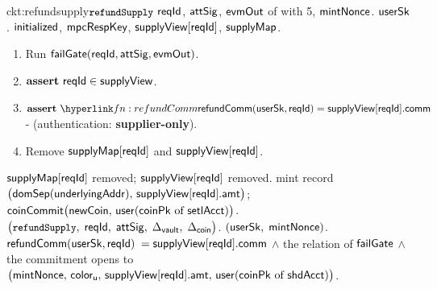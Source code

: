 \begin{CktBox}{ckt:refundsupply}{$\texttt{\small refundSupply}$}
 $\mathsf{reqId}$, $\mathsf{attSig}$, $\mathsf{evmOut}$ of with 5, $\mathsf{mintNonce}$.
 $\mathsf{userSk}$.
 $\mathsf{initialized}$, $\mathsf{mpcRespKey}$, $\mathsf{supplyView}[\mathsf{reqId}]$, $\mathsf{supplyMap}$.
\begin{enumerate}[nosep,leftmargin=1.7em,topsep=2pt]
\item Run \hyperref[ckt:failgate]{$\mathsf{failGate}(\mathsf{reqId}, \mathsf{attSig}, \mathsf{evmOut})$}.
\item $\textbf{assert}~ \mathsf{reqId} \in \mathsf{supplyView}$.
\item $\assert \lnk{fn:refundComm}{\refundComm(\usersk, \rid)} = \supplyView[\rid].\fComm$ - (authentication:
      \textbf{supplier-only}).
\item Remove $\mathsf{supplyMap}[\mathsf{reqId}]$ and $\mathsf{supplyView}[\mathsf{reqId}]$.
\end{enumerate}
\begin{OutList}
\oitem{\Dvault} $\mathsf{supplyMap}[\mathsf{reqId}]$ removed; $\mathsf{supplyView}[\mathsf{reqId}]$ removed.
\oitem{\Dshd} \bluedot mint record
  $\bigl(\mathsf{domSep}(\mathsf{underlyingAddr}),\, \mathsf{supplyView}[\mathsf{reqId}].\mathsf{amt}\bigr)$; \;
  \bluedot $\mathsf{coinCommit}\bigl(\mathsf{newCoin},\, \mathsf{user}(\mathsf{coinPk} \text{ of } \mathsf{setlAcct})\bigr)$.
\oitem{\stmt} $\bigl(\texttt{\small refundSupply},\; \mathsf{reqId},\; \mathsf{attSig},\; \Delta_{\mathsf{vault}},\; \Delta_{\mathsf{coin}}\bigr)$.
\oitem{\wit} $(\mathsf{userSk},\; \mathsf{mintNonce})$.
\oitem{\Rel} $\mathsf{refundComm}(\mathsf{userSk}, \mathsf{reqId})$ $= \mathsf{supplyView}[\mathsf{reqId}].\mathsf{comm}$ \;$\wedge$\; the relation of
  $\mathsf{failGate}$ \;$\wedge$\; the commitment opens to
  $\bigl(\mathsf{mintNonce},\, \mathsf{color}_{\mathsf{u}},\, \mathsf{supplyView}[\mathsf{reqId}].\mathsf{amt},\, \mathsf{user}(\mathsf{coinPk} \text{ of }
  \mathsf{shdAcct})\bigr)$.
\end{OutList}
\end{CktBox}

